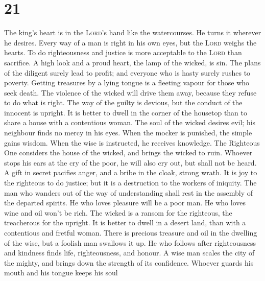 \hypertarget{section-20}{%
\section{21}\label{section-20}}

 The king's heart is in the \textsc{Lord}'s hand like the
watercourses. He turns it wherever he desires.  Every way
of a man is right in his own eyes, but the \textsc{Lord} weighs the
hearts.  To do righteousness and justice is more
acceptable to the \textsc{Lord} than sacrifice.  A high
look and a proud heart, the lamp of the wicked, is sin. 
The plans of the diligent surely lead to profit; and everyone who is
hasty surely rushes to poverty.  Getting treasures by a
lying tongue is a fleeting vapour for those who seek death.
 The violence of the wicked will drive them away, because
they refuse to do what is right.  The way of the guilty is
devious, but the conduct of the innocent is upright.  It
is better to dwell in the corner of the housetop than to share a house
with a contentious woman.  The soul of the wicked desires
evil; his neighbour finds no mercy in his eyes.  When the
mocker is punished, the simple gains wisdom. When the wise is
instructed, he receives knowledge.  The Righteous One
considers the house of the wicked, and brings the wicked to ruin.
 Whoever stops his ears at the cry of the poor, he will
also cry out, but shall not be heard.  A gift in secret
pacifies anger, and a bribe in the cloak, strong wrath. 
It is joy to the righteous to do justice; but it is a destruction to the
workers of iniquity.  The man who wanders out of the way
of understanding shall rest in the assembly of the departed spirits.
 He who loves pleasure will be a poor man. He who loves
wine and oil won't be rich.  The wicked is a ransom for
the righteous, the treacherous for the upright.  It is
better to dwell in a desert land, than with a contentious and fretful
woman.  There is precious treasure and oil in the
dwelling of the wise, but a foolish man swallows it up. 
He who follows after righteousness and kindness finds life,
righteousness, and honour.  A wise man scales the city of
the mighty, and brings down the strength of its confidence.
 Whoever guards his mouth and his tongue keeps his soul
